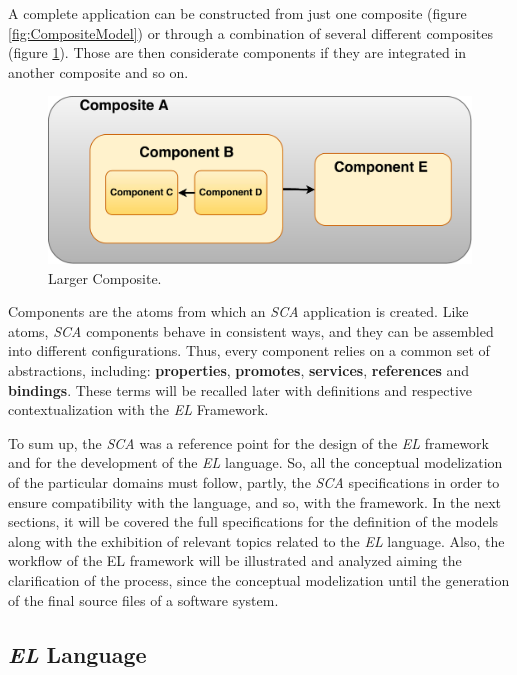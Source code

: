 A complete application can be constructed from just one composite (figure \ref{fig:CompositeModel}) or through a combination of several different composites (figure \ref{fig:CompositeModel2}). Those are then considerate components if they are integrated in another composite and so on. 
 
\begin{figure}[H]
\centering
\includegraphics[scale=0.22]{images/CompositeModel2}
\caption{Larger Composite.}
\label{fig:CompositeModel2} 
\end{figure}
 
Components are the atoms from which an \textit{SCA} application is created. Like atoms, \textit{SCA} components behave in consistent ways, and they can be assembled into different configurations. Thus, every component relies on a common set of abstractions, including: \textbf{properties}, \textbf{promotes}, \textbf{services}, \textbf{references} and \textbf{bindings}. \cite{SCA_site} These terms will be recalled later with definitions and respective contextualization with the \textit{EL} Framework. 
 
To sum up, the \textit{SCA} was a reference point for the design of the \textit{EL} framework and for the development of the \textit{EL} language. So, all the conceptual modelization of the particular domains must follow, partly, the \textit{SCA} specifications in order to ensure compatibility with the language, and so, with the framework. In the next sections, it will be covered the full specifications for the definition of the models along with the exhibition of relevant topics related to the \textit{EL} language. Also, the workflow of the EL framework will be illustrated and analyzed aiming the clarification of the process, since the conceptual modelization until the generation of the final source files of a software system.  

\subsection{\textit{EL} Language}

